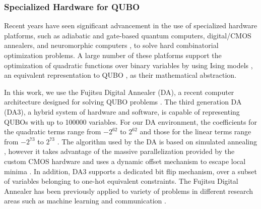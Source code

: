 \documentclass[preprint,12pt]{elsarticle}
\newcommand{\todo}[1]{{\textcolor{red}{\bf {#1}}}}
\begin{document}





\subsubsection{Specialized Hardware for QUBO}

Recent years have seen significant advancement in the use of specialized hardware platforms, such as adiabatic and gate-based quantum computers, digital/CMOS annealers, and neuromorphic computers \cite{coffrin2019evaluating}, to solve hard combinatorial optimization problems. A large number of these platforms support the optimization of quadratic functions over binary variables by using Ising models \cite{johnson2011quantum}, an equivalent representation to QUBO \cite{bian2010ising}, as their mathematical abstraction.

In this work, we use the Fujitsu Digital Annealer (DA), a recent computer architecture designed for solving QUBO problems \cite{matsubara2020digital}. The third generation DA (DA3), a hybrid system of hardware and software, is capable of representing QUBOs with up to 100000 variables. For our DA environment, the coefficients for the quadratic terms range from $-2^{62}$ to $2^{62}$ and those for the linear terms range from $-2^{73}$ to $2^{73}$ \cite{DA3}. The algorithm used by the DA is based on simulated annealing \cite{kirkpatrick1983optimization}, however it takes advantage of the massive parallelization provided by the custom CMOS hardware and uses a dynamic offset mechanism to escape local minima \cite{aramon2019physics}. In addition, DA3 supports a dedicated bit flip mechanism, over a subset of variables belonging to one-hot equivalent constraints. The Fujitsu Digital Annealer has been previously applied to variety of problems in different research areas such as machine learning \cite{cohen2020ising,salehinejad2019ising} and communication \cite{naghsh2019digitally,rahman2019ising}.
\end{document}
